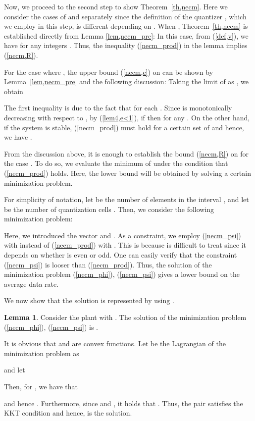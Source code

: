 \documentclass[a4paper, 11pt]{article}
\makeatletter
\theoremstyle{definition}
\newtheorem{lem}{Lemma}
\newenvironment{pf}[1][\proofname]{\par\pushQED{\qed}
 \normalfont\topsep6\p@\@plus6\p@\relax\trivlist\item[\hskip\labelsep\bfseries#1\@addpunct{.}]
 \ignorespaces}{\popQED\endtrivlist\@endpefalse}
\makeatother
\begin{document}
Now, we proceed to the second step to show Theorem~\ref{th,necm}.
Here we consider the cases of  and  separately
since the definition of the quantizer , which we employ in this step,
is different depending on .
When , Theorem~\ref{th,necm} is established directly from
Lemma \ref{lem,necm_pre}:
In this case, from (\ref{def,v}), we have
 for any
integers .
Thus, the inequality (\ref{necm_prod}) in the lemma implies (\ref{necm,R}).

For the case where , the upper bound (\ref{necm,e}) on
 can be shown
by Lemma~\ref{lem,necm_pre} and the following discussion:
Taking the limit of  as , we obtain

The first inequality is due to the fact that 
for each .
Since  is monotonically decreasing with respect
to , by (\ref{lem4,e<1}), if  then  for any .
On the other hand, if the system is stable, (\ref{necm_prod}) must hold
for a certain set of  and hence, we have .


From the discussion above, it is enough to establish the bound (\ref{necm,R})
on  for the case .
To do so, we evaluate the minimum of  under the condition that
(\ref{necm_prod}) holds.
Here, the lower bound will be obtained by solving a certain minimization
problem.

For simplicity of notation, let  be the number of elements in the interval
, and let  be the number of quantization cells
.
Then, we consider the following minimization problem:

Here, we introduced the vector  and
.
As a constraint, we employ (\ref{necm_psi}) with  instead of
(\ref{necm_prod}) with .
This is because  is difficult to treat since it depends on whether
 is even or odd.
One can easily verify that the constraint (\ref{necm_psi}) is looser than
(\ref{necm_prod}).
Thus, the solution of the minimization problem (\ref{necm_phi}), (\ref{necm_psi})
gives a lower bound on the average data rate.

We now show that the solution  is represented by using .
\begin{lem}\label{lem,opt_solution}
 Consider the plant with .
 The solution of the minimization problem (\ref{necm_phi}), (\ref{necm_psi})
is .
\end{lem}

\begin{pf}
 It is obvious that  and  are convex functions.
Let  be the Lagrangian of the minimization problem as

and let

Then, for , we have that

and hence .
Furthermore, since  and , it holds that .
Thus, the pair  satisfies the KKT condition \cite{Luenberger1997}
and hence,  is the solution.
\end{pf}
\end{document}

